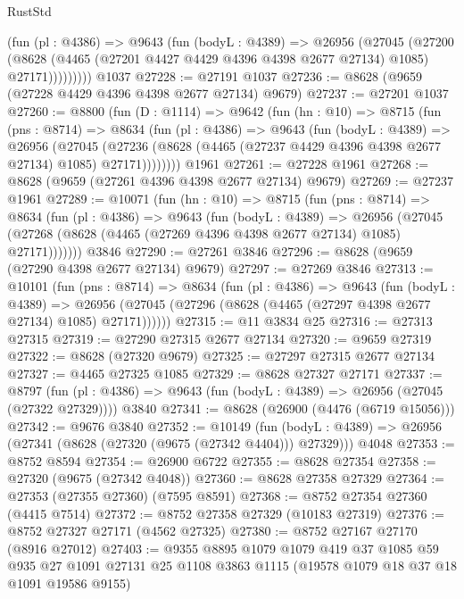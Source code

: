 \begin{lexlean}{RustStd}
\begin{coremodule}
            (fun (pl : @4386) =>
            @9643
              (fun (bodyL : @4389) =>
              @26956
                (@27045
                  (@27200
                    (@8628
                      (@4465 (@27201 @4427 @4429 @4396 @4398 @2677 @27134) @1085)
                      @27171)))))))))
    @1037
@27228 := @27191 @1037
@27236 := @8628 (@9659 (@27228 @4429 @4396 @4398 @2677 @27134) @9679)
@27237 := @27201 @1037
@27260 := @8800
    (fun (D : @1114) =>
    @9642
      (fun (hn : @10) =>
      @8715
        (fun (pns : @8714) =>
        @8634
          (fun (pl : @4386) =>
          @9643
            (fun (bodyL : @4389) =>
            @26956
              (@27045
                (@27236 (@8628 (@4465 (@27237 @4429 @4396 @4398 @2677 @27134) @1085) @27171))))))))
    @1961
@27261 := @27228 @1961
@27268 := @8628 (@9659 (@27261 @4396 @4398 @2677 @27134) @9679)
@27269 := @27237 @1961
@27289 := @10071
    (fun (hn : @10) =>
    @8715
      (fun (pns : @8714) =>
      @8634
        (fun (pl : @4386) =>
        @9643
          (fun (bodyL : @4389) =>
          @26956
            (@27045 (@27268 (@8628 (@4465 (@27269 @4396 @4398 @2677 @27134) @1085) @27171)))))))
    @3846
@27290 := @27261 @3846
@27296 := @8628 (@9659 (@27290 @4398 @2677 @27134) @9679)
@27297 := @27269 @3846
@27313 := @10101
    (fun (pns : @8714) =>
    @8634
      (fun (pl : @4386) =>
      @9643
        (fun (bodyL : @4389) =>
        @26956 (@27045 (@27296 (@8628 (@4465 (@27297 @4398 @2677 @27134) @1085) @27171))))))
@27315 := @11 @3834 @25
@27316 := @27313 @27315
@27319 := @27290 @27315 @2677 @27134
@27320 := @9659 @27319
@27322 := @8628 (@27320 @9679)
@27325 := @27297 @27315 @2677 @27134
@27327 := @4465 @27325 @1085
@27329 := @8628 @27327 @27171
@27337 := @8797
    (fun (pl : @4386) => @9643 (fun (bodyL : @4389) => @26956 (@27045 (@27322 @27329))))
    @3840
@27341 := @8628 (@26900 (@4476 (@6719 @15056)))
@27342 := @9676 @3840
@27352 := @10149
    (fun (bodyL : @4389) => @26956 (@27341 (@8628 (@27320 (@9675 (@27342 @4404))) @27329)))
    @4048
@27353 := @8752 @8594
@27354 := @26900 @6722
@27355 := @8628 @27354
@27358 := @27320 (@9675 (@27342 @4048))
@27360 := @8628 @27358 @27329
@27364 := @27353 (@27355 @27360) (@7595 @8591)
@27368 := @8752 @27354 @27360 (@4415 @7514)
@27372 := @8752 @27358 @27329 (@10183 @27319)
@27376 := @8752 @27327 @27171 (@4562 @27325)
@27380 := @8752 @27167 @27170 (@8916 @27012)
@27403 := @9355
    @8895
    @1079
    @1079
    @419
    @37
    @1085
    @59
    @935
    @27
    @1091
    @27131
    @25
    @1108
    @3863
    @1115
    (@19578 @1079 @18 @37 @18 @1091 @19586 @9155)

\end{coremodule}
\end{lexlean}
